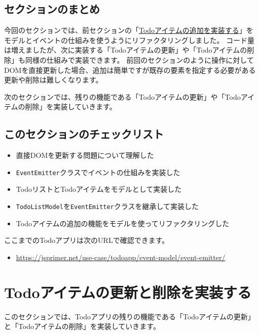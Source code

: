 \hypertarget{conclusion}{%
\subsection{セクションのまとめ}\label{conclusion}}

今回のセクションでは、前セクションの「\hyperlink{form-event}{Todoアイテムの追加を実装する}」をモデルとイベントの仕組みを使うようにリファクタリングしました。
コード量は増えましたが、次に実装する「Todoアイテムの更新」や「Todoアイテムの削除」も同様の仕組みで実装できます。
前回のセクションのように操作に対してDOMを直接更新した場合、追加は簡単ですが既存の要素を指定する必要がある更新や削除は難しくなります。

次のセクションでは、残りの機能である「Todoアイテムの更新」や「Todoアイテムの削除」を実装していきます。

\hypertarget{section-checklist}{%
\subsection{このセクションのチェックリスト}\label{section-checklist}}

\begin{itemize}
\item
  直接DOMを更新する問題について理解した
\item
  \texttt{EventEmitter}クラスでイベントの仕組みを実装した
\item
  TodoリストとTodoアイテムをモデルとして実装した
\item
  \texttt{TodoListModel}を\texttt{EventEmitter}クラスを継承して実装した
\item
  Todoアイテムの追加の機能をモデルを使ってリファクタリングした
\end{itemize}

ここまでのTodoアプリは次のURLで確認できます。

\begin{itemize}
\item
  \url{https://jsprimer.net/use-case/todoapp/event-model/event-emitter/}
\end{itemize}

\hypertarget{todo-item-update-and-delete}{%
\section{Todoアイテムの更新と削除を実装する}\label{todo-item-update-and-delete}}

このセクションでは、Todoアプリの残りの機能である「Todoアイテムの更新」と「Todoアイテムの削除」を実装していきます。

